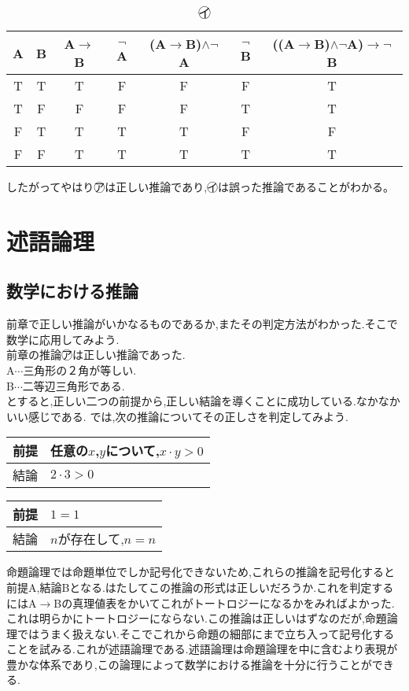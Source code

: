 \documentclass[10pt,b5paper,papersize,dvipdfmx]{jsbook}
\begin{document}
\begin{table}[H]
\begin{center}
\caption{\textcircled{\scriptsize イ}}
\begin{tabular}{|c|c||c|c|c|c|c|}\hline
A&B&A$\to$B&$\lnot$A&(A$\to$B)$\land\lnot$A&$\lnot$B&((A$\to$B)$\land\lnot$A)$\to\lnot$B \\ \hline \hline
T&T&T&F&F&F&T \\ \hline
T&F&F&F&F&T&T \\ \hline
F&T&T&T&T&F&F \\ \hline
F&F&T&T&T&T&T \\ \hline
\end{tabular}
\end{center}
\end{table}
したがってやはり\textcircled{\scriptsize ア}は正しい推論であり,\textcircled{\scriptsize イ}は誤った推論であることがわかる。

\section{述語論理}
\subsection{数学における推論}
前章で正しい推論がいかなるものであるか,またその判定方法がわかった.そこで数学に応用してみよう.\\
前章の推論\textcircled{\scriptsize ア}は正しい推論であった.\\
A$\cdots$三角形の２角が等しい.\\
B$\cdots$二等辺三角形である.\\
とすると,正しい二つの前提から,正しい結論を導くことに成功している.なかなかいい感じである.
では,次の推論についてその正しさを判定してみよう.\\
\begin{table}[H]
\begin{tabular}{ll}
前提&任意の$x$,$y$について,$x\cdot y>0$ \\ \hline
結論&$2\cdot 3>0$\\
\end{tabular}
\end{table}
\begin{table}[H]
\begin{tabular}{ll}
前提&$1=1$ \\ \hline
結論&$n$が存在して,$n=n$\\
\end{tabular}
\end{table}
命題論理では命題単位でしか記号化できないため,これらの推論を記号化すると前提A,結論Bとなる.はたしてこの推論の形式は正しいだろうか.これを判定するにはA$\to$Bの真理値表をかいてこれがトートロジーになるかをみればよかった.これは明らかにトートロジーにならない.この推論は正しいはずなのだが,命題論理ではうまく扱えない.そこでこれから命題の細部にまで立ち入って記号化することを試みる.これが述語論理である.述語論理は命題論理を中に含むより表現が豊かな体系であり,この論理によって数学における推論を十分に行うことができる.
\end{document}
